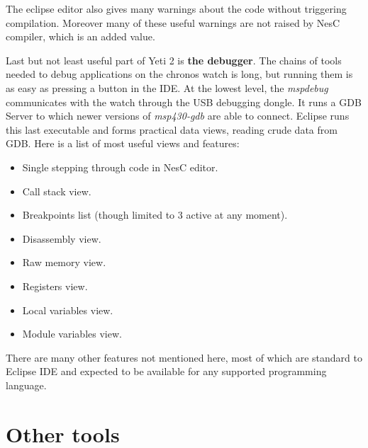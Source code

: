 The eclipse editor also gives many warnings about the code without
triggering compilation. Moreover many of these useful warnings are not
raised by NesC compiler, which is an added value. 

Last but not least useful part of Yeti 2 is {\bf the debugger}. The
chains of tools needed to debug applications on the chronos watch is
long, but running them is as easy as pressing a button in the IDE. At
the lowest level, the \emph{mspdebug} communicates with the watch
through the USB debugging dongle. It runs a GDB Server to which newer
versions of \emph{msp430-gdb} are able to connect. Eclipse runs this
last executable and forms practical data views, reading crude data
from GDB. Here is a list of most useful views and features:
\begin{itemize}
  \item Single stepping through code in NesC editor.
  \item Call stack view.
  \item Breakpoints list (though limited to 3 active at any moment).
  \item Disassembly view.
  \item Raw memory view.
  \item Registers view.
  \item Local variables view.
  \item Module variables view.
\end{itemize}

There are many other features not mentioned here, most of which are
standard to Eclipse IDE and expected to be available for any supported
programming language.

\section{Other tools}



